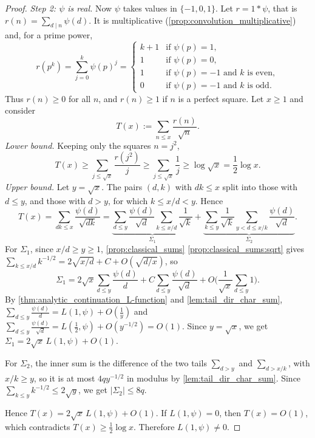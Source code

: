 \begin{proof}
    \emph{Step 2: $\psi$ is real.} Now $\psi$ takes values in $\{-1,0,1\}$. Let $r = 1*\psi$, that is $r(n) = \sum_{d\mid n}\psi(d)$. It is multiplicative (\cref{prop:convolution_multiplicative}) and, for a prime power,
    \begin{equation*}
        r(p^k) = \sum_{j=0}^{k}\psi(p)^j =
        \begin{cases}
            k+1 & \text{if } \psi(p) = 1,\\
            1 & \text{if } \psi(p) = 0,\\
            1 & \text{if } \psi(p) = -1 \text{ and $k$ is even},\\
            0 & \text{if } \psi(p) = -1 \text{ and $k$ is odd}.
        \end{cases}
    \end{equation*}
    Thus $r(n)\ge0$ for all $n$, and $r(n)\ge 1$ if $n$ is a perfect square. Let $x \ge 1$ and consider
    \begin{equation*}
        T(x) := \sum_{n\le x}\frac{r(n)}{\sqrt n}.
    \end{equation*}
    \emph{Lower bound.} Keeping only the squares $n = j^2$,
    \begin{equation*}
        T(x)\ge\sum_{j\le\sqrt x}\frac{r(j^2)}{j}\ge\sum_{j\le\sqrt x}\frac1j\ge\log\sqrt x = \frac12\log x.
    \end{equation*}
    \emph{Upper bound.} Let $y = \sqrt x$. The pairs $(d,k)$ with $dk\le x$ split into those with $d\le y$, and those with $d>y$, for which $k\le x/d<y$. Hence
    \begin{equation*}
        T(x) = \sum_{dk\le x}\frac{\psi(d)}{\sqrt{dk}} = \underbrace{\sum_{d\le y}\frac{\psi(d)}{\sqrt d}\sum_{k\le x/d}\frac{1}{\sqrt k}}_{\Sigma_1} + \underbrace{\sum_{k\le y}\frac{1}{\sqrt k}\sum_{y<d\le x/k}\frac{\psi(d)}{\sqrt d}}_{\Sigma_2}.
    \end{equation*}
    For $\Sigma_1$, since $x/d\ge y \ge 1$, \cref{prop:classical_sums} \ref{prop:classical_sums:sqrt} gives $\sum_{k\le x/d}k^{-1/2} = 2\sqrt{x/d} + C + O(\sqrt{d/x})$, so
    \begin{equation*}
        \Sigma_1 = 2\sqrt x\sum_{d\le y}\frac{\psi(d)}{d} + C\sum_{d\le y}\frac{\psi(d)}{\sqrt d} + O\Big(\frac{1}{\sqrt x}\sum_{d\le y}1\Big).
    \end{equation*}
    By \cref{thm:analytic_continuation_L-function} and \cref{lem:tail_dir_char_sum}, $\sum_{d\le y}\frac{\psi(d)}{d} = L(1,\psi) + O\left(\frac1y\right)$ and $\sum_{d\le y}\frac{\psi(d)}{\sqrt d} = L(\tfrac12,\psi) + O(y^{-1/2}) = O(1)$. Since $y = \sqrt x$, we get $\Sigma_1 = 2\sqrt x\,L(1,\psi) + O(1)$.

    For $\Sigma_2$, the inner sum is the difference of the two tails $\sum_{d>y}$ and $\sum_{d>x/k}$, with $x/k\ge y$, so it is at most $4qy^{-1/2}$ in modulus by \cref{lem:tail_dir_char_sum}. Since $\sum_{k\le y}k^{-1/2}\le 2\sqrt y$, we get $\lvert\Sigma_2\rvert\le 8q$.

    Hence $T(x) = 2\sqrt x\,L(1,\psi) + O(1)$. If $L(1,\psi) = 0$, then $T(x) = O(1)$, which contradicts $T(x)\ge\frac12\log x$. Therefore $L(1,\psi)\neq0$.
\end{proof}

